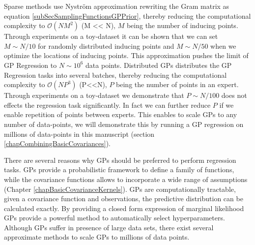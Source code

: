 Sparse methods use Nystr\"{o}m approximation rewriting the Gram matrix as equation \ref{subSecSamplingFunctionsGPPrior}, thereby reducing the computational complexity to \(\mathcal{O}(NM^{2})\) (M << N), \(M\) being the number of inducing points. Through experiments on a toy-dataset it can be shown that we can set \(M \sim N/10\) for randomly distributed inducing points and \(M \sim N/50\) when we optimize the locations of inducing points. This approximation pushes the limit of GP Regression to \(N \sim 10^6\) data points. Distributed GPs distributes the GP Regression tasks into several batches, thereby reducing the computational complexity to \(\mathcal{O}(NP^{3})\) (P<<N), \(P\) being the number of points in an expert. Through experiments on a toy-dataset we demonstrate that \(P \sim N/100\) does not effects the regression task significantly. In fact we can further reduce \(P\) if we enable repetition of points between experts. This enables to scale GPs to any number of data-points, we will demonstrate this by running a GP regression on millions of data-points in this manuscript (section \ref{chapCombiningBasicCovariances}). 

There are several reasons why GPs should be preferred to perform regression tasks. GPs provide a probabilistic framework to define a family of functions, while the covariance functions allows to incorporate a wide range of assumptions (Chapter \ref{chapBasicCovarianceKernels}). GPs are computationally tractable, given a covariance function and observations, the predictive distribution can be calculated exactly. By providing a closed form expression of marginal likelihood GPs provide a powerful method to automatically select hyperparameters. Although GPs suffer in presence of large data sets, there exist several approximate methods to scale GPs to millions of data points. 




